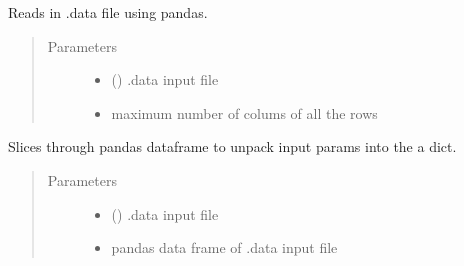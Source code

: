 \documentclass[letterpaper,10pt,english]{sphinxmanual}
\begin{document}
\begin{fulllineitems}
\begin{fulllineitems}
\label{\detokenize{autoapi/Input/index:Input.Input.read}}
\sphinxAtStartPar
Reads in .data file using pandas.
\begin{quote}\begin{description}
\item[{Parameters}] \leavevmode\begin{itemize}
\item {} 
\sphinxAtStartPar
{} () \textendash{} .data input file

\item {} 
\sphinxAtStartPar
{} \textendash{} maximum number of colums of all the rows

\end{itemize}

\end{description}\end{quote}

\end{fulllineitems}


\begin{fulllineitems}
\label{\detokenize{autoapi/Input/index:Input.Input.update_dict}}
\sphinxAtStartPar
Slices through pandas dataframe to unpack input params into the a dict.
\begin{quote}\begin{description}
\item[{Parameters}] \leavevmode\begin{itemize}
\item {} 
\sphinxAtStartPar
{} () \textendash{} .data input file

\item {} 
\sphinxAtStartPar
{} \textendash{} pandas data frame of .data input file


\end{itemize}
\end{description}
\end{quote}
\end{fulllineitems}
\end{fulllineitems}
\end{document}
